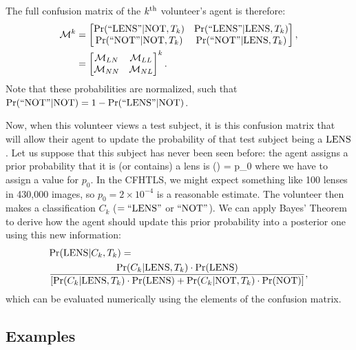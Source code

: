 \documentclass[useAMS,usenatbib,a4paper]{mn2e}
\begin{document}
The full confusion matrix of the $k^{\rm th}$ volunteer's agent is therefore:
\begin{align}
  \mathcal{M}^k &= 
  \begin{bmatrix}
    {\rm Pr}({\rm ``LENS"}|{\rm NOT},T_k) & {\rm Pr}({\rm ``LENS"}|{\rm LENS},T_k) \\
    {\rm Pr}({\rm ``NOT"} |{\rm NOT},T_k) & {\rm Pr}({\rm ``NOT"} |{\rm LENS},T_k)
  \end{bmatrix}, \notag \\
        &=
  \begin{bmatrix}
    \mathcal{M}_{LN} & \mathcal{M}_{LL} \\
    \mathcal{M}_{NN} & \mathcal{M}_{NL}
  \end{bmatrix}^k.
  \label{eq:confmat}
\end{align}
Note that these probabilities are normalized, such that
${\rm Pr}({\rm ``NOT"} |{\rm NOT}) = 1 - {\rm Pr}({\rm ``LENS"}|{\rm NOT})$.

Now, when this volunteer views a test subject, 
it is this confusion matrix that will allow their agent to update the
probability of that test subject being a ${\rm LENS}$. Let us suppose that
this subject has never been seen before: the agent assigns a 
prior probability that it is (or contains) a lens is 
\be
  \pr(\LENS) = p_0
\ee
where we have to assign a value for $p_0$. In the CFHTLS, we might expect
something like 100 lenses in 430,000 images, so $p_0 = 2\times10^{-4}$
is a reasonable estimate. The volunteer then makes a classification $C_k$ 
($= {\rm ``LENS"}$ or ${\rm ``NOT"}$).
We can apply Bayes' Theorem to derive how the agent should
update this prior probability into a posterior one using this new information:
\begin{align}
  \label{eq:app:first}
  & {\rm Pr}({\rm LENS}|C_k,T_k) = \\
  & \frac{{\rm Pr}(C_k|{\rm LENS},T_k)\cdot{\rm Pr}({\rm LENS})}
{\left[ {\rm Pr}(C_k|{\rm LENS},T_k)\cdot{\rm Pr}({\rm LENS}) + {\rm Pr}(C_k|{\rm NOT},T_k)\cdot{\rm Pr}({\rm NOT}) \right]},
  \notag
\end{align}
which can be evaluated numerically using the elements of the confusion
matrix. 

\subsection{Examples}
\label{appendix:swap:examples}
\end{document}
